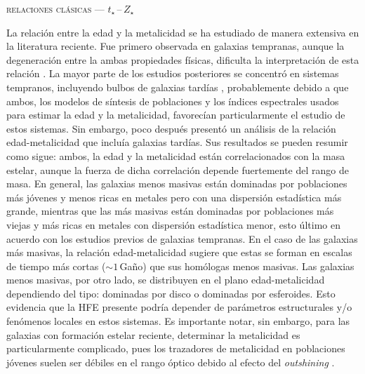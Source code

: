 \documentclass[xcolor=dvipsnames,4pt,hyperref={colorlinks,citecolor=black,linkcolor=black,urlcolor=black}]{beamer}
\begin{document}
\begin{frame}{\textsc{relaciones clásicas --- $t_\star\,$--$\,Z_\star$}}

La relación entre la edad y la metalicidad se ha estudiado de manera extensiva en la literatura
reciente. Fue primero observada en galaxias tempranas, aunque la degeneración entre la ambas
propiedades físicas, dificulta la interpretación de esta relación \citep{Worthey1994}. La mayor
parte de los estudios posteriores se concentró en sistemas tempranos, incluyendo bulbos de galaxias
tardías \citep{Proctor2002, Terlevich2002}, probablemente debido a que ambos, los modelos de
síntesis de poblaciones y los índices espectrales usados para estimar la edad y la metalicidad,
favorecían particularmente el estudio de estos sistemas.
%
Sin embargo, poco después \citet{Gallazzi2005} presentó un análisis de la relación edad-metalicidad
que incluía galaxias tardías. Sus resultados se pueden resumir como sigue: ambos, la edad y la
metalicidad están correlacionados con la masa estelar, aunque la fuerza de dicha correlación depende
fuertemente del rango de masa. En general, las galaxias menos masivas están dominadas por
poblaciones más jóvenes y menos ricas en metales pero con una dispersión estadística más grande,
mientras que las más masivas están dominadas por poblaciones más viejas y más ricas en metales con
dispersión estadística menor, esto último en acuerdo con los estudios previos de galaxias tempranas.
En el caso de las galaxias más masivas, la relación edad-metalicidad sugiere que estas se forman en
escalas de tiempo más cortas ($\sim1\,$Gaño) que sus homólogas menos masivas.
Las galaxias menos masivas, por otro lado, se distribuyen en el plano edad-metalicidad dependiendo
del tipo: dominadas por disco o dominadas por esferoides. Esto evidencia que la HFE presente podría
depender de parámetros estructurales y/o fenómenos locales en estos sistemas.
Es importante notar, sin embargo, para las galaxias con formación estelar reciente, determinar la
metalicidad es particularmente complicado, pues los trazadores de metalicidad en poblaciones jóvenes
suelen ser débiles en el rango óptico debido al efecto del \emph{outshining}
\citep[e.\,g.,][]{Conroy2013a}.
\end{frame}
\end{document}
